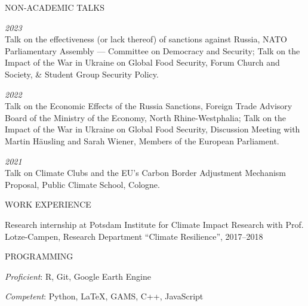 \documentclass{article}
\begin{document}
\begin{minipage}[t]{0.12\textwidth}
    {\selectfont NON-ACADEMIC TALKS} \\
\end{minipage}
\hspace{5mm}
\begin{minipage}[t]{0.8\textwidth}
    \textit{2023} \\
    Talk on the effectiveness (or lack thereof) of sanctions against Russia, NATO Parliamentary Assembly --- Committee on Democracy and Security; Talk on the Impact of the War in Ukraine on Global Food Security, Forum Church and Society, \& Student Group Security Policy. \par 
    \textit{2022} \\
    Talk on the Economic Effects of the Russia Sanctions, Foreign Trade Advisory Board of the Ministry of the Economy, North Rhine-Westphalia; Talk on the Impact of the War in Ukraine on Global Food Security, Discussion Meeting with Martin Häusling and Sarah Wiener, Members of the European Parliament. \par
    \textit{2021} \\
    Talk on Climate Clubs and the EU's Carbon Border Adjustment Mechanism Proposal, Public Climate School, Cologne. \par
\end{minipage}
\medskip


\begin{minipage}[t]{0.12\textwidth}
    {\selectfont WORK EXPERIENCE} \\
\end{minipage}
\hspace{5mm}
\begin{minipage}[t]{0.8\textwidth}
    Research internship at Potsdam Institute for Climate Impact Research with Prof. Lotze-Campen, Research Department ``Climate Resilience'', 2017--2018
\end{minipage}
\medskip


\begin{minipage}[t]{0.12\textwidth}
    {\selectfont PROGRAMMING} \\
\end{minipage}
\hspace{5mm}
\begin{minipage}[t]{0.8\textwidth}
    \textit{Proficient}: R, Git, Google Earth Engine \par
    \textit{Competent}: Python, LaTeX, GAMS, C++, JavaScript
\end{minipage}
\medskip
\end{document}
